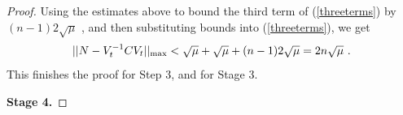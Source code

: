 \documentclass{amsart}
\theoremstyle{definition}
\theoremstyle{remark}
\numberwithin{equation}{section}
\begin{document}
{{\begin{proof}
Using the estimates above to bound the third term of 
(\ref{threeterms}) by $(n-1)2\sqrt{\mu}$ , and then substituting bounds 
into (\ref{threeterms}), we get 
\begin{align*} 
||N-V_t^{-1}CV_t ||_{\textnormal{max}}  
< \sqrt{\mu }
+ \sqrt{\mu }
+
 {(n-1)2\sqrt{\mu}}  = 2n\sqrt{\mu} \ .
\end{align*} 
This finishes the proof for Step 3, and for  
 Stage 3. 

{\bf Stage 4.} 


%


\end{proof}}}
\end{document}
